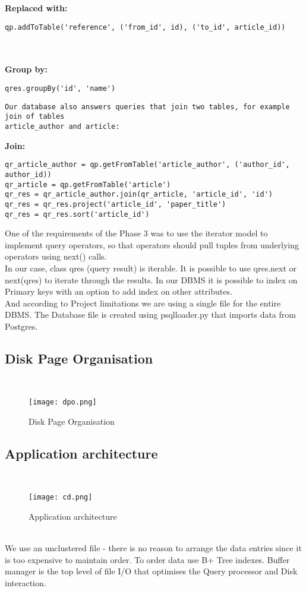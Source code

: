 \documentclass{article}
\begin{document}
\textbf{Replaced with:}

\begin{verbatim}
qp.addToTable('reference', ('from_id', id), ('to_id', article_id))
\end{verbatim}
~
\\
\\
\textbf{Group by:}

\begin{verbatim}
qres.groupBy('id', 'name')
\end{verbatim}

\begin{verbatim}
Our database also answers queries that join two tables, for example join of tables 
article_author and article:
\end{verbatim}

\textbf{Join:}

\begin{verbatim}
qr_article_author = qp.getFromTable('article_author', ('author_id', author_id))
qr_article = qp.getFromTable('article')
qr_res = qr_article_author.join(qr_article, 'article_id', 'id')
qr_res = qr_res.project('article_id', 'paper_title')
qr_res = qr_res.sort('article_id')
\end{verbatim}

One of the requirements of the Phase 3 was to use the iterator model to implement query operators, so that operators should pull tuples from underlying operators using next() calls. \\
In our case, class qres (query result) is iterable. It is possible to use qres.next or next(qres) to iterate through the results.
In our DBMS it is possible to index on Primary keys with an option to add index on other attributes. \\
And according to Project limitations we are using a single file for the entire DBMS. The Database file is created using psqlloader.py that imports data from Postgres.

\newpage
\subsection{Disk Page Organisation}
~
\newline
\begin{figure}[h!]
  \centering
      \texttt{[image: dpo.png]}
  \caption{Disk Page Organisation}
\end{figure}

\newpage
\subsection{Application architecture}
~
~
\begin{figure}[h!]
  \centering
      \texttt{[image: cd.png]}
  \caption{Application architecture}
\end{figure}
~
\\
We use an unclustered file - there is no reason to arrange the data entries since it is too expensive to maintain order. To order data use B+ Tree indexes.
Buffer manager is the top level of file I/O that optimises the Query processor and Disk interaction.
\end{document}
